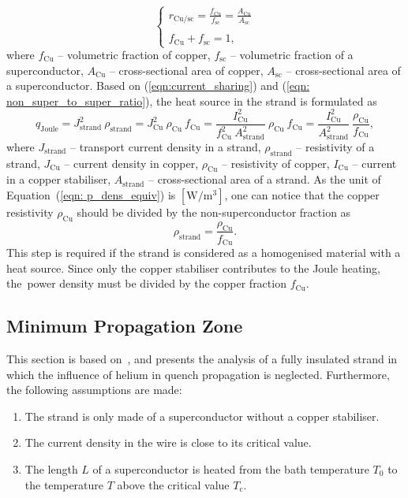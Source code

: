 \begin{equation}
    \left\{ \begin{array}{ll}
    r_\text{Cu/sc} = \frac{f_\text{Cu}}{f_\text{sc}} = \frac{A_\text{Cu}}{A_\text{sc}}\\ \\
    f_\text{Cu} + f_\text{sc} = 1,
    \end{array} \right.
    \label{eqn: non_super_to_super_ratio}
\end{equation}
where $f_\text{Cu}$ -- volumetric fraction of copper, $f_\text{sc}$ -- volumetric fraction of a superconductor, $A_\text{Cu}$ -- cross-sectional area of copper, $A_\text{sc}$ -- cross-sectional area of a superconductor. Based on (\ref{eqn:current_sharing}) and (\ref{eqn: non_super_to_super_ratio}), the heat source in the strand is formulated as 
\begin{equation}
    q_\text{Joule} = J_\text{strand}^2~\rho_\text{strand} = J_\text{Cu}^2~\rho_\text{Cu}~f_\text{Cu} = \frac{I_\text{Cu}^2}{f_\text{Cu}^2~A_\text{strand}^2}~\rho_\text{Cu}~f_\text{Cu} = \frac{I_\text{Cu}^2}{A_\text{strand}^2}~\frac{\rho_\text{Cu}}{f_\text{Cu}}, 
    \label{eqn: p_dens_equiv}
\end{equation}
where $J_\text{strand}$ -- transport current density in a strand, $\rho_\text{strand}$ -- resistivity of a strand, $J_\text{Cu}$ -- current density in copper, $\rho_\text{Cu}$ -- resistivity of copper, $I_\text{Cu}$ -- current in a copper stabiliser, $A_\text{strand}$ -- cross-sectional area of a strand. As the unit of Equation~(\ref{eqn: p_dens_equiv}) is $[\text{W}/\text{m}^3]$, one can notice that the copper resistivity $\rho_\text{Cu}$ should be divided by the non-superconductor fraction as 
\begin{equation}
    \rho_\text{strand} = \frac{\rho_\text{Cu}}{f_\text{Cu}}.
    \label{eqn:strand_resistivity}
\end{equation}
This step is required if the strand is considered as a homogenised material with a heat source. Since only the copper stabiliser contributes to the Joule heating, the~power density must be divided by the copper fraction $f_\text{Cu}$.

\subsection{Minimum Propagation Zone}

This section is based on~\cite[p.~124]{superconducting_accelerator_magnets}, and presents the analysis of a fully insulated strand in which the influence of helium in quench propagation is neglected. Furthermore, the following assumptions are made: 
\begin{enumerate}
    \item The strand is only made of a superconductor without a copper stabiliser. 
    \item The current density in the wire is close to its critical value. 
    \item The length $L$ of a superconductor is heated from the bath temperature $T_0$ to the temperature $T$ above the critical value $T_\text{c}$.
\end{enumerate}


